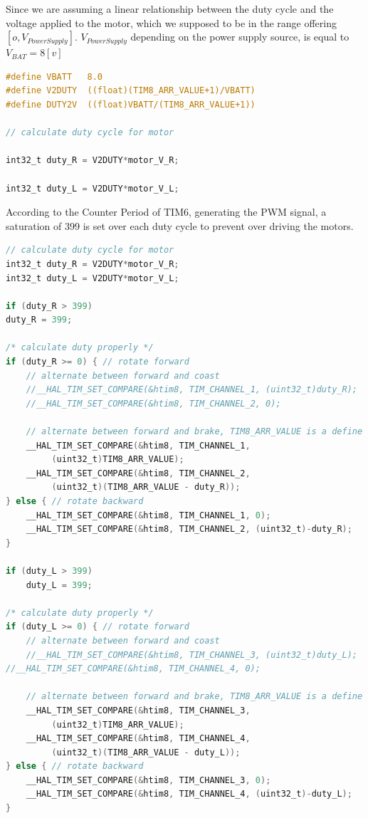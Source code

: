 \documentclass[english]{article}
\begin{document}
    Since we are assuming a linear relationship between the duty cycle and
     the voltage applied to the motor, which we supposed to be in the range offering
     $[o, V_{PowerSupply}]$. $V_{PowerSupply}$ depending on the power supply source,
    is equal to $V_{BAT} = 8[v]$
\newpage
\begin{lstlisting}[language=C, caption={calculating duty cycle}, label={lst:duty} ]
#define VBATT	8.0 
#define V2DUTY	((float)(TIM8_ARR_VALUE+1)/VBATT) 
#define DUTY2V	((float)VBATT/(TIM8_ARR_VALUE+1)) 

// calculate duty cycle for motor 

int32_t duty_R = V2DUTY*motor_V_R; 

int32_t duty_L = V2DUTY*motor_V_L;   
\end{lstlisting}
According to the Counter Period of TIM6, generating the PWM signal,
a saturation of 399 is set over each duty cycle to prevent over driving the motors. 
\begin{lstlisting}[language=C, caption={calculating duty cycle and command the motors}, label={lst:duty1} ]
// calculate duty cycle for motor
int32_t duty_R = V2DUTY*motor_V_R;
int32_t duty_L = V2DUTY*motor_V_L;

if (duty_R > 399)
duty_R = 399;

/* calculate duty properly */
if (duty_R >= 0) { // rotate forward
    // alternate between forward and coast
    //__HAL_TIM_SET_COMPARE(&htim8, TIM_CHANNEL_1, (uint32_t)duty_R);
    //__HAL_TIM_SET_COMPARE(&htim8, TIM_CHANNEL_2, 0);

    // alternate between forward and brake, TIM8_ARR_VALUE is a define
    __HAL_TIM_SET_COMPARE(&htim8, TIM_CHANNEL_1,
         (uint32_t)TIM8_ARR_VALUE);
    __HAL_TIM_SET_COMPARE(&htim8, TIM_CHANNEL_2,
         (uint32_t)(TIM8_ARR_VALUE - duty_R));
} else { // rotate backward
    __HAL_TIM_SET_COMPARE(&htim8, TIM_CHANNEL_1, 0);
    __HAL_TIM_SET_COMPARE(&htim8, TIM_CHANNEL_2, (uint32_t)-duty_R);
}

if (duty_L > 399)
    duty_L = 399;

/* calculate duty properly */
if (duty_L >= 0) { // rotate forward
    // alternate between forward and coast
    //__HAL_TIM_SET_COMPARE(&htim8, TIM_CHANNEL_3, (uint32_t)duty_L);
//__HAL_TIM_SET_COMPARE(&htim8, TIM_CHANNEL_4, 0);

    // alternate between forward and brake, TIM8_ARR_VALUE is a define
    __HAL_TIM_SET_COMPARE(&htim8, TIM_CHANNEL_3,
         (uint32_t)TIM8_ARR_VALUE);
    __HAL_TIM_SET_COMPARE(&htim8, TIM_CHANNEL_4, 
         (uint32_t)(TIM8_ARR_VALUE - duty_L));
} else { // rotate backward
    __HAL_TIM_SET_COMPARE(&htim8, TIM_CHANNEL_3, 0);
    __HAL_TIM_SET_COMPARE(&htim8, TIM_CHANNEL_4, (uint32_t)-duty_L);
} 
\end{lstlisting}
\end{document}

